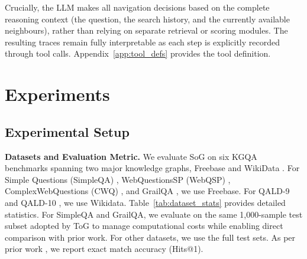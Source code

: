 \documentclass[sigconf]{acmart}
\begin{document}

Crucially, the LLM makes all navigation decisions based on the complete reasoning context (the question, the search history, and the currently available neighbours), rather than relying on separate retrieval or scoring modules. The resulting traces remain fully interpretable as each step is explicitly recorded through tool calls. Appendix~\ref{app:tool_defs} provides the tool definition.

\section{Experiments}
\label{sec:experiments}

\subsection{Experimental Setup}
\label{sec:exp-setup}

\noindent\textbf{Datasets and Evaluation Metric.} We evaluate SoG on six KGQA benchmarks spanning two major knowledge graphs, Freebase \citep{bollacker2008freebase} and WikiData \citep{vrandevcic2014wikidata}. For Simple Questions (SimpleQA) \citep{bordes2015large}, WebQuestionsSP (WebQSP) \citep{yih2016value}, ComplexWebQuestions (CWQ) \citep{talmor2018web}, and GrailQA \citep{gu2021beyond}, we use Freebase. For QALD-9 \citep{perevalov2022qald} and QALD-10 \citep{perevalov2022qald}, we use Wikidata. Table~\ref{tab:dataset_stats} provides detailed statistics. For SimpleQA and GrailQA, we evaluate on the same 1,000-sample test subset adopted by ToG \citep{sun2024thinkongraph} to manage computational costs while enabling direct comparison with prior work. For other datasets, we use the full test sets. As per prior work \citep{li2023few, sun2024thinkongraph,chen2024plan}, we report exact match accuracy (Hits@1).
\end{document}
